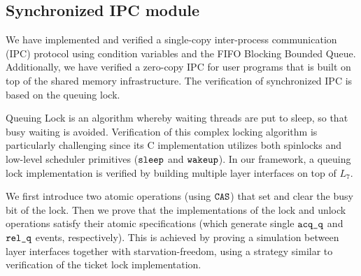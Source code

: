 {%

\subsection{Synchronized IPC module}
\label{sec:con:ipc}
We have implemented and verified a single-copy
inter-process communication (IPC) protocol using condition variables
and the FIFO Blocking Bounded Queue.
Additionally, we have verified a
zero-copy IPC for user programs that is built on top of the
shared memory infrastructure.
The verification of synchronized IPC is based on the 
queuing lock.

Queuing Lock is an algorithm whereby waiting threads are put to sleep,
so that busy waiting is avoided.
Verification of this complex locking algorithm is particularly
challenging since its C implementation utilizes both
spinlocks and low-level scheduler primitives (${\texttt{sleep}}$ and ${\texttt{wakeup}}$).
In our framework, a queuing lock implementation is verified
by building multiple layer interfaces on top of $L_7$.


We first introduce two atomic operations (using ${\texttt{CAS}}$)
that set and clear the busy bit of the lock.
Then we prove that the implementations
of the lock and unlock operations
satisfy their atomic specifications
(which generate single ${\texttt{acq\_q}}$ and ${\texttt{rel\_q}}$ events, respectively).
This is achieved by proving a simulation between layer interfaces together
with starvation-freedom, using a strategy similar to verification of
the ticket lock implementation.

\ignore{
\begin{figure}
 = C, multicols=2] {source_code/ipc.c}
\caption{Implementation of Single-Copy IPC}
\label{fig:exp:ipc}
\end{figure}

\vspace{-3pt}
\paragraph{Trap handler}
\label{sec:base:trapm}

}}
